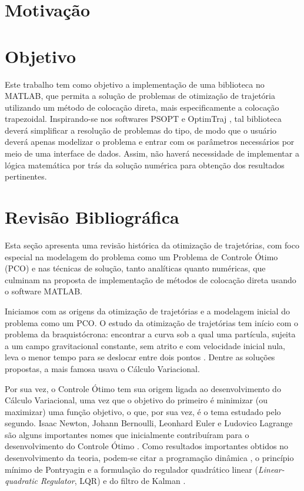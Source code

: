 \section{Motivação}
\label{sec:motivação}




\section{Objetivo}
\label{sec:objetivo}

Este trabalho tem como objetivo a implementação de uma biblioteca no MATLAB, que permita a solução de problemas de otimização de trajetória utilizando um método de colocação direta, mais especificamente a colocação trapezoidal. Inspirando-se nos softwares PSOPT \cite{becerra_psopt_2022} e OptimTraj \cite{kelly_optimtraj_2022}, tal biblioteca deverá simplificar a resolução de problemas do tipo, de modo que o usuário deverá apenas modelizar o problema e entrar com os parâmetros necessários por meio de uma interface de dados. Assim, não haverá necessidade de implementar a lógica matemática por trás da solução numérica para obtenção dos resultados pertinentes.


\section{Revisão Bibliográfica}
\label{sec:rev-bibliografica}

Esta seção apresenta uma revisão histórica da otimização de trajetórias, com foco especial na modelagem do problema como um Problema de Controle Ótimo (PCO) e nas técnicas de solução, tanto analíticas quanto numéricas, que culminam na proposta de implementação de métodos de colocação direta usando o software MATLAB.


Iniciamos com as origens da otimização de trajetórias e a modelagem inicial do problema como um PCO. O estudo da otimização de trajetórias tem início com o problema da braquistócrona: encontrar a curva sob a qual uma partícula, sujeita a um campo gravitacional constante, sem atrito e com velocidade inicial nula, leva o menor tempo para se deslocar entre dois pontos \cite{sussmann_300_1997}. Dentre as soluções propostas, a mais famosa usava o Cálculo Variacional.

Por sua vez, o Controle Ótimo tem sua origem ligada ao desenvolvimento do Cálculo Variacional, uma vez que o objetivo do primeiro é minimizar (ou maximizar) uma função objetivo, o que, por sua vez, é o tema estudado pelo segundo. Isaac Newton, Johann Bernoulli, Leonhard Euler e Ludovico Lagrange são alguns importantes nomes que inicialmente contribuíram para o desenvolvimento do Controle Ótimo \cite{becerra_optimal_2008}. Como resultados importantes obtidos no desenvolvimento da teoria, podem-se citar a programação dinâmica \cite{bellman_dynamic_2010}, o princípio mínimo de Pontryagin \cite{pontryagin_mathematical_1987} e a formulação do regulador quadrático linear (\textit{Linear-quadratic Regulator}, LQR) e do filtro de Kalman \cite{kalman_contributions_1960, kalman_new_1960}.

